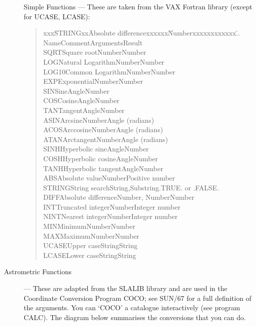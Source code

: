 \begin{description}
Simple Functions --- These are taken from the VAX Fortran library
(except for UCASE, LCASE):
\begin{quote}
\begin{tabbing}
xxx\=STRINGxx\=Absolute differencexxxxxx\=Numberxxxxxxxxxxxx\=..\kill
\>Name\>Comment\>Arguments\>Result\\
\>SQRT\>Square root\>Number\>Number\\
\>LOG\>Natural Logarithm\>Number\>Number\\
\>LOG10\>Common Logarithm\>Number\>Number\\
\>EXP\>Exponential\>Number\>Number\\
\>SIN\>Sine\>Angle\>Number\\
\>COS\>Cosine\>Angle\>Number\\
\>TAN\>Tangent\>Angle\>Number\\
\>ASIN\>Arcsine\>Number\>Angle (radians)\\
\>ACOS\>Arccosine\>Number\>Angle (radians)\\
\>ATAN\>Arctangent\>Number\>Angle (radians)\\
\>SINH\>Hyperbolic sine\>Angle\>Number\\
\>COSH\>Hyperbolic cosine\>Angle\>Number\\
\>TANH\>Hyperbolic tangent\>Angle\>Number\\
\>ABS\>Absolute value\>Number\>Positive number\\
\>STRING\>String search\>String,Substring\>.TRUE. or .FALSE.\\
\>DIFF\>Absolute difference\>Number, Number\>Number\\
\>INT\>Truncated integer\>Number\>Integer number\\
\>NINT\>Nearest integer\>Number\>Integer number\\
\>MIN\>Minimum\>Number\>Number\\
\>MAX\>Maximum\>Number\>Number\\
\>UCASE\>Upper case\>String\>String\\
\>LCASE\>Lower case\>String\>String\\
\end{tabbing}
\end{quote}
\item [Astrometric Functions] ---
These are adapted from the SLALIB library and are used in the Coordinate
Conversion Program COCO; see SUN/67 for a full definition of the arguments.
You can `COCO' a catalogue interactively (see program CALC).
The diagram below summarises the conversions that you can do.

\end{description}
